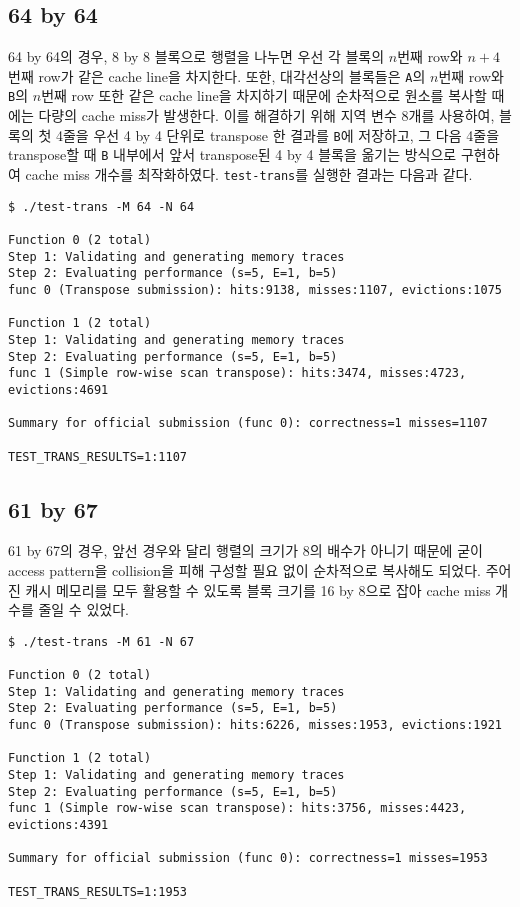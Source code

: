 \documentclass{scrartcl}
\begin{document}
\subsection{64 by 64}
64 by 64의 경우, 8 by 8 블록으로 행렬을 나누면 우선 각 블록의 \(n\)번째 row와
\(n + 4\)번째 row가 같은 cache line을 차지한다. 또한, 대각선상의 블록들은
\texttt{A}의 \(n\)번째 row와 \texttt{B}의 \(n\)번째 row 또한 같은 cache line을
차지하기 때문에 순차적으로 원소를 복사할 때에는 다량의 cache miss가 발생한다.
이를 해결하기 위해 지역 변수 8개를 사용하여, 블록의 첫 4줄을 우선 4 by 4 단위로
transpose 한 결과를 \texttt{B}에 저장하고, 그 다음 4줄을 transpose할 때
\texttt{B} 내부에서 앞서 transpose된 4 by 4 블록을 옮기는 방식으로 구현하여
cache miss 개수를 최작화하였다. \texttt{test-trans}를 실행한 결과는 다음과
같다.
\begin{lstlisting}
$ ./test-trans -M 64 -N 64

Function 0 (2 total)
Step 1: Validating and generating memory traces
Step 2: Evaluating performance (s=5, E=1, b=5)
func 0 (Transpose submission): hits:9138, misses:1107, evictions:1075

Function 1 (2 total)
Step 1: Validating and generating memory traces
Step 2: Evaluating performance (s=5, E=1, b=5)
func 1 (Simple row-wise scan transpose): hits:3474, misses:4723, evictions:4691

Summary for official submission (func 0): correctness=1 misses=1107

TEST_TRANS_RESULTS=1:1107
\end{lstlisting}

\subsection{61 by 67}
61 by 67의 경우, 앞선 경우와 달리 행렬의 크기가 8의 배수가 아니기 때문에 굳이
access pattern을 collision을 피해 구성할 필요 없이 순차적으로 복사해도 되었다.
주어진 캐시 메모리를 모두 활용할 수 있도록 블록 크기를 16 by 8으로 잡아 cache
miss 개수를 줄일 수 있었다.
\begin{lstlisting}
$ ./test-trans -M 61 -N 67

Function 0 (2 total)
Step 1: Validating and generating memory traces
Step 2: Evaluating performance (s=5, E=1, b=5)
func 0 (Transpose submission): hits:6226, misses:1953, evictions:1921

Function 1 (2 total)
Step 1: Validating and generating memory traces
Step 2: Evaluating performance (s=5, E=1, b=5)
func 1 (Simple row-wise scan transpose): hits:3756, misses:4423, evictions:4391

Summary for official submission (func 0): correctness=1 misses=1953

TEST_TRANS_RESULTS=1:1953
\end{lstlisting}
\end{document}
